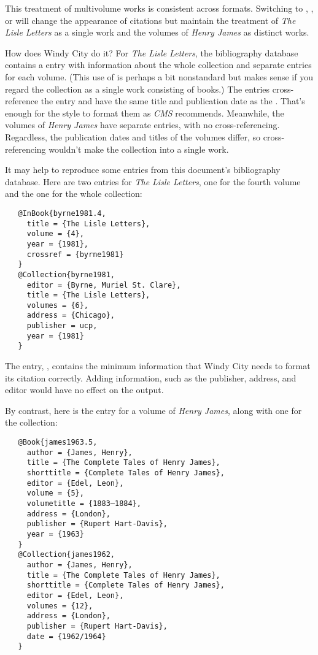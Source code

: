 \documentclass[11pt,letterpaper,oneside]{article}
\begin{document}
This treatment of multivolume works is consistent across formats.
Switching to , , or  will change
the appearance of citations but maintain the treatment of \textit{The
Lisle Letters} as a single work and the volumes of \textit{Henry
James} as distinct works.

How does Windy City do it? For \textit{The Lisle Letters}, the
bibliography database contains a  entry with
information about the whole collection and separate 
entries for each volume. (This use of  is perhaps a
bit nonstandard but makes sense if you regard the collection as a
single work consisting of books.) The  entries
cross-reference the  entry and have the same title
and publication date as the . That's enough for
the style to format them as \textit{CMS} recommends. Meanwhile, the
volumes of \textit{Henry James} have separate  entries,
with no cross-referencing. Regardless, the publication dates and
titles of the volumes differ, so cross-referencing wouldn't make the
collection into a single work.

It may help to reproduce some entries from this document's
bibliography database. Here are two entries for \textit{The Lisle
Letters}, one for the fourth volume and the one for the whole
collection:

\begin{verbatim}
   @InBook{byrne1981.4,
     title = {The Lisle Letters},
     volume = {4},
     year = {1981},
     crossref = {byrne1981}
   }
   @Collection{byrne1981,
     editor = {Byrne, Muriel St. Clare},
     title = {The Lisle Letters},
     volumes = {6},
     address = {Chicago},
     publisher = ucp,
     year = {1981}
   }
\end{verbatim}

The  entry, , contains the
minimum information that Windy City needs to format its citation
correctly. Adding information, such as the publisher, address, and
editor would have no effect on the output.

By contrast, here is the  entry for a volume of
\textit{Henry James}, along with one for the collection:

\begin{verbatim}
   @Book{james1963.5,
     author = {James, Henry},
     title = {The Complete Tales of Henry James},
     shorttitle = {Complete Tales of Henry James},
     editor = {Edel, Leon},
     volume = {5},
     volumetitle = {1883–1884},
     address = {London},
     publisher = {Rupert Hart-Davis},
     year = {1963}
   }
   @Collection{james1962,
     author = {James, Henry},
     title = {The Complete Tales of Henry James},
     shorttitle = {Complete Tales of Henry James},
     editor = {Edel, Leon},
     volumes = {12},
     address = {London},
     publisher = {Rupert Hart-Davis},
     date = {1962/1964}
   }
\end{verbatim}
\end{document}
